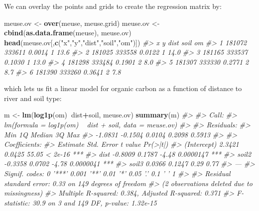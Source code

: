 \documentclass[11pt]{krantz}
\newenvironment{Shaded}{\begin{snugshade}}{\end{snugshade}}
\newcommand{\CommentTok}[1]{\textcolor[rgb]{0.37,0.37,0.37}{\textit{#1}}}
\newcommand{\KeywordTok}[1]{\textcolor[rgb]{0.27,0.27,0.27}{\textbf{#1}}}
\newcommand{\NormalTok}[1]{#1}
\newcommand{\OperatorTok}[1]{\textcolor[rgb]{0.43,0.43,0.43}{\textbf{#1}}}
\newcommand{\StringTok}[1]{\textcolor[rgb]{0.5,0.5,0.5}{#1}}
\theoremstyle{definition}
\theoremstyle{definition}
\theoremstyle{definition}
\theoremstyle{remark}
\begin{document}
We can overlay the points and grids to create the regression matrix by:

\begin{Shaded}
\begin{Highlighting}[]
\NormalTok{meuse.ov <-}\StringTok{ }\KeywordTok{over}\NormalTok{(meuse, meuse.grid)}
\NormalTok{meuse.ov <-}\StringTok{ }\KeywordTok{cbind}\NormalTok{(}\KeywordTok{as.data.frame}\NormalTok{(meuse), meuse.ov)}
\KeywordTok{head}\NormalTok{(meuse.ov[,}\KeywordTok{c}\NormalTok{(}\StringTok{"x"}\NormalTok{,}\StringTok{"y"}\NormalTok{,}\StringTok{"dist"}\NormalTok{,}\StringTok{"soil"}\NormalTok{,}\StringTok{"om"}\NormalTok{)])}
\CommentTok{#>        x      y   dist soil   om}
\CommentTok{#> 1 181072 333611 0.0014    1 13.6}
\CommentTok{#> 2 181025 333558 0.0122    1 14.0}
\CommentTok{#> 3 181165 333537 0.1030    1 13.0}
\CommentTok{#> 4 181298 333484 0.1901    2  8.0}
\CommentTok{#> 5 181307 333330 0.2771    2  8.7}
\CommentTok{#> 6 181390 333260 0.3641    2  7.8}
\end{Highlighting}
\end{Shaded}

which lets us fit a linear model for organic carbon as a function of
distance to river and soil type:

\begin{Shaded}
\begin{Highlighting}[]
\NormalTok{m <-}\StringTok{ }\KeywordTok{lm}\NormalTok{(}\KeywordTok{log1p}\NormalTok{(om)}\OperatorTok{~}\NormalTok{dist}\OperatorTok{+}\NormalTok{soil, meuse.ov)}
\KeywordTok{summary}\NormalTok{(m)}
\CommentTok{#> }
\CommentTok{#> Call:}
\CommentTok{#> lm(formula = log1p(om) ~ dist + soil, data = meuse.ov)}
\CommentTok{#> }
\CommentTok{#> Residuals:}
\CommentTok{#>     Min      1Q  Median      3Q     Max }
\CommentTok{#> -1.0831 -0.1504  0.0104  0.2098  0.5913 }
\CommentTok{#> }
\CommentTok{#> Coefficients:}
\CommentTok{#>             Estimate Std. Error t value  Pr(>|t|)    }
\CommentTok{#> (Intercept)   2.3421     0.0425   55.05   < 2e-16 ***}
\CommentTok{#> dist         -0.8009     0.1787   -4.48 0.0000147 ***}
\CommentTok{#> soil2        -0.3358     0.0702   -4.78 0.0000041 ***}
\CommentTok{#> soil3         0.0366     0.1247    0.29      0.77    }
\CommentTok{#> ---}
\CommentTok{#> Signif. codes:  0 '***' 0.001 '**' 0.01 '*' 0.05 '.' 0.1 ' ' 1}
\CommentTok{#> }
\CommentTok{#> Residual standard error: 0.33 on 149 degrees of freedom}
\CommentTok{#>   (2 observations deleted due to missingness)}
\CommentTok{#> Multiple R-squared:  0.384,  Adjusted R-squared:  0.371 }
\CommentTok{#> F-statistic: 30.9 on 3 and 149 DF,  p-value: 1.32e-15}
\end{Highlighting}
\end{Shaded}
\end{document}

